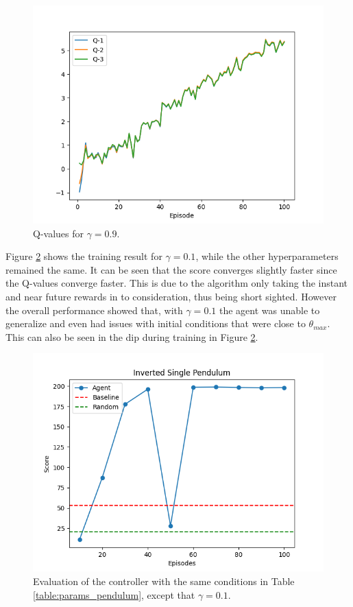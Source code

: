\documentclass[final]{LTHtwocol} %
\begin{document}
\begin{figure}[htp]
	\centering
	\includegraphics[width=0.9\columnwidth]{figures/Pendulum_q_gamma_09.png}
	\caption{Q-values for $\gamma=0.9$.}
	\label{fig:pendulum_gamma_09}
\end{figure}

Figure \ref{fig:single_pendulum_eval_01} shows the training result for $\gamma=0.1$, while the other hyperparameters remained the same. It can be seen that the score converges slightly faster since the Q-values converge faster. This is due to the algorithm only taking the instant and near future rewards in to consideration, thus being short sighted. However the overall performance showed that, with $\gamma=0.1$ the agent was unable to generalize and even had issues with initial conditions that were close to $\theta_{max}$. This can also be seen in the dip during training in Figure \ref{fig:single_pendulum_eval_01}.
\begin{figure}[htp]
	\centering
	\includegraphics[width=0.9\columnwidth]{figures/SinglePendulum_gamma_01_evaluation_score.png}
	\caption{Evaluation of the controller with the same conditions in Table \ref{table:params_pendulum}, except that $\gamma=0.1$.}
	\label{fig:single_pendulum_eval_01}
\end{figure}
\end{document}
